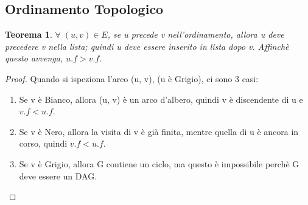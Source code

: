 \documentclass{article}
\newtheorem{theorem}{Teorema}[section]
\begin{document}
\subsection{Ordinamento Topologico}

\begin{theorem}
    $\forall \; (u, v) \in E$, se u precede v nell'ordinamento, allora u deve precedere v nella lista; quindi
    u deve essere inserito in lista dopo v. Affinchè questo avvenga, $u.f > v.f$.
\end{theorem}

\begin{proof}
    Quando si ispeziona l'arco (u, v), (u è Grigio), ci sono 3 casi:
    \begin{enumerate}
        \item Se v è Bianco, allora (u, v) è un arco d'albero, quindi v è discendente di u e $v.f < u.f$.
        \item Se v è Nero, allora la visita di v è già finita, mentre quella di u è ancora in corso, quindi $v.f < u.f$.
        \item Se v è Grigio, allora G contiene un ciclo, ma questo è impossibile perchè G deve essere un DAG.
    \end{enumerate}
\end{proof}
\end{document}
